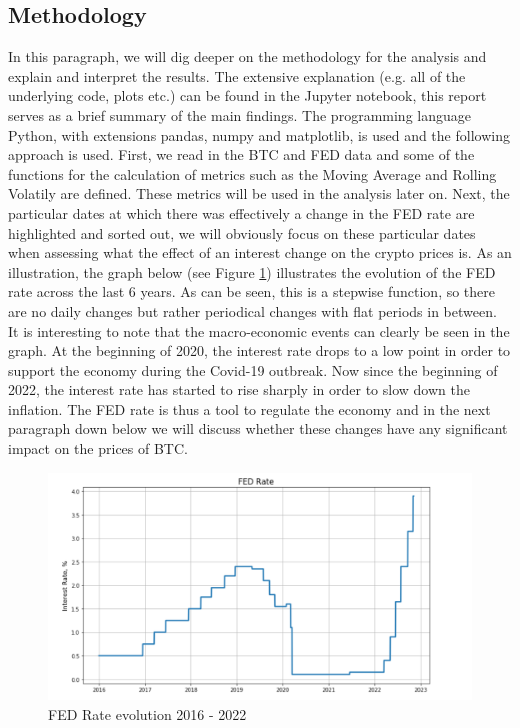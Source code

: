 \documentclass[12pt]{article}
\begin{document}
\subsection{Methodology}
In this paragraph, we will dig deeper on the methodology for the analysis and explain and interpret the results. The extensive explanation (e.g. all of the underlying code, plots etc.) can be found in the Jupyter notebook, this report serves as a brief summary of the main findings. \newline \newline
The programming language Python, with extensions pandas, numpy and matplotlib, is used and the following approach is used. First, we read in the BTC and FED data and some of the functions for the calculation of metrics such as the Moving Average and Rolling Volatily are defined. These metrics will be used in the analysis later on. Next, the particular dates at which there was effectively a change in the FED rate are highlighted and sorted out, we will obviously focus on these particular dates when assessing what the effect of an interest change on the crypto prices is. \newline
\newline As an illustration, the graph below (see Figure \ref{fig:FED Rate evolution 2016 - 2022}) illustrates the evolution of the FED rate across the last 6 years. As can be seen, this is a stepwise function, so there are no daily changes but rather periodical changes with flat periods in between. \newline It is interesting to note that the macro-economic events can clearly be seen in the graph. At the beginning of 2020, the interest rate drops to a low point in order to support the economy during the Covid-19 outbreak. Now since the beginning of 2022, the interest rate has started to rise sharply in order to slow down the inflation. The FED rate is thus a tool to regulate the economy and in the next paragraph down below we will discuss whether these changes have any significant impact on the prices of BTC.

\begin{figure}[!htb]
   \includegraphics[scale=0.7]{research_project/text/paper/FED rate graph.png}
   \centering
   \caption{FED Rate evolution 2016 - 2022}
   \label{fig:FED Rate evolution 2016 - 2022}
\end{figure}
\end{document}
